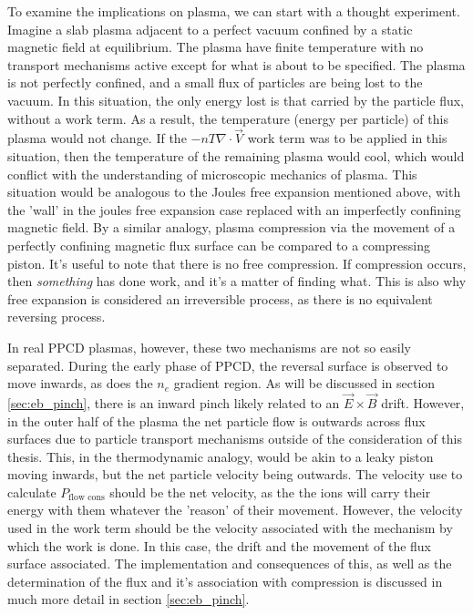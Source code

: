 \begin{refsection}
To examine the implications on plasma, we can start with a thought experiment. Imagine a  slab plasma adjacent to a perfect vacuum confined by a static magnetic field at equilibrium. The plasma have finite temperature with no transport mechanisms active except for what is about to be specified. The plasma is not perfectly confined, and a small flux of particles are being lost to the vacuum. In this situation, the only energy lost is that carried by the particle flux, without a work term. As a result, the temperature (energy per particle) of this plasma would not change. If the $- nT\nabla\cdot\vec{V}$ work term was to be applied in this situation, then the temperature of the remaining plasma would cool, which would conflict with the understanding of microscopic mechanics of plasma. This situation would be analogous to the Joules free expansion mentioned above, with the 'wall' in the joules free expansion case replaced with an imperfectly confining magnetic field. By a similar analogy, plasma compression via the movement of a perfectly confining magnetic flux surface can be compared to a compressing piston. It's useful to note that there is no free compression. If compression occurs, then \emph{something} has done work, and it's a matter of finding what. This is also why free expansion is considered an irreversible process, as there is no equivalent reversing process.

In real PPCD plasmas, however, these two mechanisms are not so easily separated. During the early phase of PPCD, the reversal surface is observed to move inwards, as does the $n_e$ gradient region. As will be discussed in section \ref{sec:eb_pinch}, there is an inward pinch likely related to an $\vec{E}\times\vec{B}$ drift. However, in the outer half of the plasma the net particle flow is outwards across flux surfaces due to particle transport mechanisms outside of the consideration of this thesis. This, in the thermodynamic analogy, would be akin to a leaky piston moving inwards, but the net particle velocity being outwards. The velocity use to calculate $P_{\text{flow cons}}$ should be the net velocity, as the the ions will carry their energy with them whatever the 'reason' of their movement. However, the velocity used in the work term should be the velocity associated with the mechanism by which the work is done. In this case, the \ecb drift and the movement of the flux surface associated. The implementation and consequences of this, as well as the determination of the \ecb flux and it's association with compression is discussed in much more detail in section \ref{sec:eb_pinch}.


\end{refsection}

